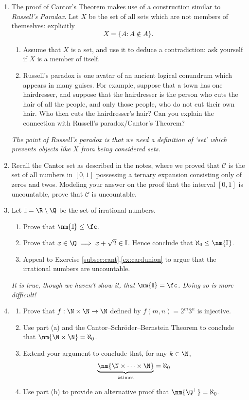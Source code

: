 \begin{exercises}{}{}
\begin{enumerate}
   \item The proof of Cantor's Theorem makes use of a construction similar to \emph{Russell's Paradox.} Let $X$ be the set of all sets which are not members of themselves: explicitly
  	\[X=\{A:A\not\in A\}.\]
  	\begin{enumerate}
    	\item Assume that $X$ is a set, and use it to deduce a contradiction: ask yourself if $X$ is a member of itself.
    	\item Russell's paradox is one avatar of an ancient logical conundrum which appears in many guises. For example, suppose that a town has one hairdresser, and suppose that the hairdresser is the person who cuts the hair of all the people, and only those people, who do not cut their own hair. Who then cuts the hairdresser's hair? Can you explain the connection with Russell's paradox/Cantor's Theorem?
  	\end{enumerate}
  	\emph{The point of Russell's paradox is that we need a definition of `set' which prevents objects like $X$ from being considered sets.}
  
	\item Recall the Cantor set as described in the notes, where we proved that $\mathcal C$ is the set of all numbers in $[0,1]$ possessing a ternary expansion consisting only of zeros and twos. Modeling your answer on the proof that the interval $[0,1]$ is uncountable, prove that $\mathcal C$ is uncountable.
	
	\item Let $\mathbb I=\R\setminus\Q$ be the set of irrational numbers.
	\begin{enumerate}
	  \item Prove that $\nm{\mathbb I}\le\fc$.
	  \item Prove that $x\in\Q\implies x+\sqrt 2\in\mathbb I$. Hence conclude that $\aleph_0\le\nm{\mathbb I}$.
	  \item Appeal to Exercise \ref*{subsec:cant}.\ref{ex:cardunion} to argue that the irrational numbers are uncountable.
 	\end{enumerate}
 	\emph{It is true, though we haven't show it, that $\nm{\mathbb I}=\fc$. Doing so is more difficult!}
  	
 	\item\begin{enumerate}
  		\item Prove that $f:\N\times\N\to\N$ defined by $f(m,n)=2^m3^n$ is injective.
  		\item Use part (a) and the Cantor--Schr\"oder--Bernstein Theorem to conclude that $\nm{\N\times\N}=\aleph_0$.
  		\item Extend your argument to conclude that, for any $k\in\N$,
  		\[\underbrace{\nm{\N\times\cdots\times\N}}_{k\text{times}}=\aleph_0\]
  		\item Use part (b) to provide an alternative proof that $\nm{\Q^+}=\aleph_0$.
  	\end{enumerate}
	

\end{enumerate}
\end{exercises}
